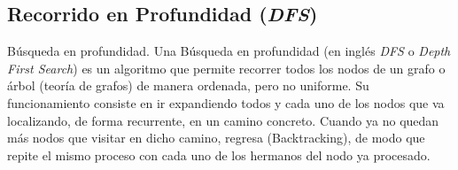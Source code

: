 \subsection{Recorrido en Profundidad (\emph{DFS})}
Búsqueda en profundidad. Una Búsqueda en profundidad (en inglés \emph{DFS} o \emph{Depth First Search}) es un algoritmo que permite recorrer todos los nodos de un grafo o árbol (teoría de grafos) de manera ordenada, pero no uniforme. Su funcionamiento consiste en ir expandiendo todos y cada uno de los nodos que va localizando, de forma recurrente, en un camino concreto. Cuando ya no quedan más nodos que visitar en dicho camino, regresa (Backtracking), de modo que repite el mismo proceso con cada uno de los hermanos del nodo ya procesado.
